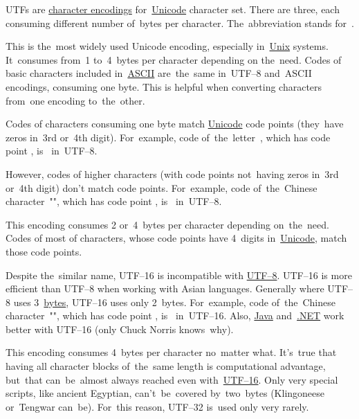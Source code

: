 \label{utf}
UTFs are \hyperref[charactersetencoding]{character encodings} for~\hyperref[unicode]{Unicode} character set.
There are three, each consuming different number of~bytes per character.
The~abbreviation stands for~.

\label{utf8}
This is the~most widely used Unicode encoding, especially in~\hyperref[unixlinux]{Unix} systems.
It~consumes from~1 to~4~bytes per character depending on the~need.
Codes of basic characters included in~\hyperref[ascii]{ASCII} are~the~same \mbox{in UTF--8} and~ASCII encodings, consuming one byte.
This is helpful when converting characters from~one encoding to~the~other.

Codes of characters consuming one byte match \hyperref[unicode]{Unicode} code points (they~have zeros in~3rd or~4th digit).
For~example, code of~the~letter~, which has code point , is~ \mbox{in UTF--8}.

However, codes of higher characters (with code points not~having zeros in~3rd or~4th digit) don't match code points.
For~example, code of~the~Chinese \mbox{character ""}, which has code point , \mbox{is~} \mbox{in UTF--8}.

\label{utf16}
This encoding consumes 2 or~4~bytes per character depending on~the~need.
Codes of most of characters, whose code points have 4~digits in~\hyperref[unicode]{Unicode}, match those code points.

Despite the~similar name, \mbox{UTF--16} is incompatible with \hyperref[utf8]{\mbox{UTF--8}}.
\mbox{UTF--16} is more efficient than \mbox{UTF--8} when working with Asian languages.
Generally where \mbox{UTF--8} uses 3~\hyperref[bitsbytes]{bytes}, \mbox{UTF--16} uses only 2~bytes.
For~example, code of~the~Chinese \mbox{character ""}, which has code point , \mbox{is~} \mbox{in UTF--16}.
Also, \hyperref[java]{Java} and~\hyperref[dotnet]{.NET} work better with \mbox{UTF--16} (only Chuck Norris knows~why).

This encoding consumes 4~bytes per character no~matter what.
It's~true that having all character blocks of~the~same length is computational advantage, but~that can~be~almost always reached even \mbox{with~\hyperref[utf16]{UTF--16}}.
Only very special scripts, like ancient Egyptian, can't~be~covered by~two~bytes (Klingoneese or~Tengwar can~be).
For~this reason, \mbox{UTF--32} is~used only very rarely.
